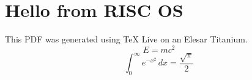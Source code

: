 \documentclass{article}
\begin{document}
\section{Hello from RISC OS}
This PDF was generated using
TeX Live on an Elesar Titanium.
\[
E = mc^2
\]
\[
\int_0^\infty e^{-x^2}\,dx
=
\frac{\sqrt{\pi}}{2}
\]
\end{document}
